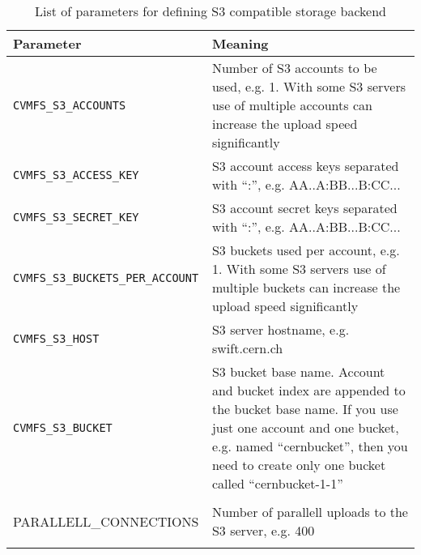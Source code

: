 	\begin{longtable}{lX}
		\toprule
		{\bf\centering Parameter} 			& {\bf\centering Meaning}\\
		\midrule
                \tt CVMFS\_S3\_ACCOUNTS & Number of S3 accounts to be used, e.g. 1. With some S3 servers use of multiple accounts can increase the upload speed significantly\\
                \tt CVMFS\_S3\_ACCESS\_KEY & S3 account access keys separated with ``:'', e.g. AA..A:BB...B:CC...\\
                \tt CVMFS\_S3\_SECRET\_KEY & S3 account secret keys separated with ``:'', e.g. AA..A:BB...B:CC...\\
                \tt CVMFS\_S3\_BUCKETS\_PER\_ACCOUNT & S3 buckets used per account, e.g. 1. With some S3 servers use of multiple buckets can increase the upload speed significantly\\
                \tt CVMFS\_S3\_HOST & S3 server hostname, e.g. swift.cern.ch\\
                \tt CVMFS\_S3\_BUCKET & S3 bucket base name. Account and bucket index are appended to the bucket base name. If you use just one account and one bucket, e.g. named ``cernbucket'', then you need to create only one bucket called ``cernbucket-1-1''\\
                \tt \begin{tabular}[t]{@{}l@{}}CVMFS\_S3\_MAX\_NUMBER\_OF\_\\PARALLELL\_CONNECTIONS\end{tabular} & Number of parallell uploads to the S3 server, e.g. 400\\
		\bottomrule
	\caption{List of parameters for defining S3 compatible storage backend}
	\label{tbl:s3confparameters}
	\end{longtable}
